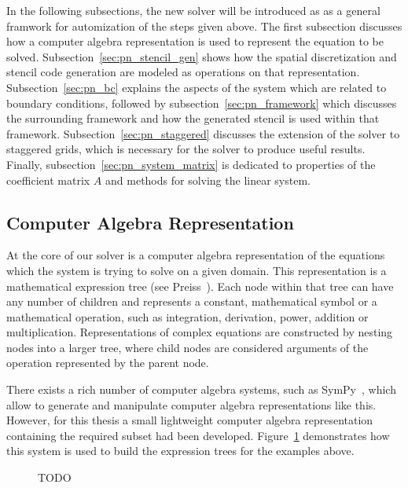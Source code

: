 In the following subsections, the new solver will be introduced as as a general framwork for automization of the steps given above. The first subsection discusses how a computer algebra representation is used to represent the equation to be solved. Subsection~\ref{sec:pn_stencil_gen} shows how the spatial discretization and stencil code generation are modeled as operations on that representation. Subsection~\ref{sec:pn_bc} explains the aspects of the system which are related to boundary conditions, followed by subsection~\ref{sec:pn_framework} which discusses the surrounding framework and how the generated stencil is used within that framework. Subsection~\ref{sec:pn_staggered} discusses the extension of the solver to staggered grids, which is necessary for the solver to produce useful results. Finally, subsection~\ref{sec:pn_system_matrix} is dedicated to properties of the coefficient matrix $A$ and methods for solving the linear system.

\subsection{Computer Algebra Representation}
\label{sec:pn_car}

At the core of our solver is a computer algebra representation of the equations which the system is trying to solve on a given domain. This representation is a mathematical expression tree (see Preiss~\cite{Preiss00}). Each node within that tree can have any number of children and represents a constant, mathematical symbol or a mathematical operation, such as integration, derivation, power, addition or multiplication. Representations of complex equations are constructed by nesting nodes into a larger tree, where child nodes are considered arguments of the operation represented by the parent node.

There exists a rich number of computer algebra systems, such as SymPy~\cite{Meurer17}, which allow to generate and manipulate computer algebra representations like this. However, for this thesis a small lightweight computer algebra representation containing the required subset had been developed. Figure~\ref{fig:pn_math_expression_tree_generation} demonstrates how this system is used to build the expression trees for the examples above.
\begin{figure}[h]
\centering
{}
\caption{TODO}
\label{fig:pn_math_expression_tree_generation}
\end{figure}

